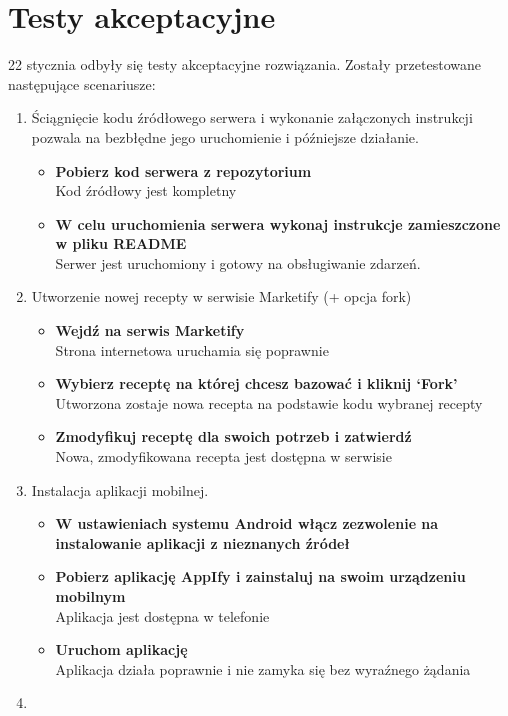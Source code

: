 \documentclass[11pt,a4paper,polish,thesis]{dcsbook}
\begin{document}
\section{Testy akceptacyjne}
22 stycznia odbyły się testy akceptacyjne rozwiązania. Zostały przetestowane następujące scenariusze:
\begin{enumerate}
\item
Ściągnięcie kodu źródłowego serwera i wykonanie załączonych instrukcji pozwala na bezbłędne jego uruchomienie i późniejsze działanie.
\begin{itemize}
\item \textbf{Pobierz kod serwera z repozytorium}\\
Kod źródłowy jest kompletny
\item \textbf{W celu uruchomienia serwera wykonaj instrukcje zamieszczone w pliku README}\\
Serwer jest uruchomiony i gotowy na obsługiwanie zdarzeń.
\end{itemize}
\item
Utworzenie nowej recepty w serwisie Marketify (+ opcja fork)
\begin{itemize}
\item \textbf{Wejdź na serwis Marketify}\\
Strona internetowa uruchamia się poprawnie
\item \textbf{Wybierz receptę na której chcesz bazować i kliknij ‘Fork’}\\
Utworzona zostaje nowa recepta na podstawie kodu wybranej recepty
\item \textbf{Zmodyfikuj receptę dla swoich potrzeb i zatwierdź}\\
Nowa, zmodyfikowana recepta jest dostępna w serwisie
\end{itemize}
\item
Instalacja aplikacji mobilnej.
\begin{itemize}
\item \textbf{W ustawieniach systemu Android włącz zezwolenie na instalowanie aplikacji z nieznanych źródeł}\\
\item \textbf{Pobierz aplikację AppIfy i zainstaluj na swoim urządzeniu mobilnym}\\
Aplikacja jest dostępna w telefonie
\item \textbf{Uruchom aplikację}\\
Aplikacja działa poprawnie i nie zamyka się bez wyraźnego żądania
\end{itemize}
\item

\end{enumerate}
\end{document}
